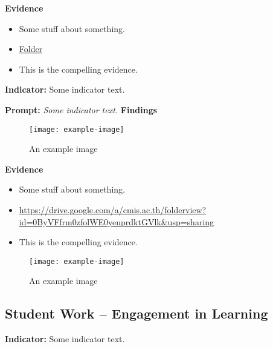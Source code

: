\documentclass{report}
\begin{document}
\noindent\textbf{Evidence}
\vspace{-\topsep}

\begin{itemize}[leftmargin=*]
\setlength{\parskip}{0pt}
\setlength{\itemsep}{0pt plus 1pt}
\item Some stuff about something.
\item \href{https://drive.google.com/a/cmis.ac.th/folderview?id=0ByVFfrm0zfolWE0yenprdktGVlk&usp=sharing}{Folder}
\item This is the compelling evidence.
\end{itemize}

\noindent\textbf{Indicator:} Some indicator text.

\noindent\textbf{Prompt:} \textit{Some indicator text.}
\noindent\textbf{Findings}

\blindtext

\blinditemize[6]

\blindtext

\begin{figure}[h!]
\caption[An example image]{An example image}
\centering
\texttt{[image: example-image]}
\end{figure}


\noindent\textbf{Evidence}
\vspace{-\topsep}

\begin{itemize}[leftmargin=*]
\setlength{\parskip}{0pt}
\setlength{\itemsep}{0pt plus 1pt}
\item Some stuff about something.
\item \url{https://drive.google.com/a/cmis.ac.th/folderview?id=0ByVFfrm0zfolWE0yenprdktGVlk&usp=sharing}
\item This is the compelling evidence.
\end{itemize}

\begin{figure}[h!]
\caption[An example image]{An example image}
\centering
\texttt{[image: example-image]}
\end{figure}


\subsection{Student Work -- Engagement in Learning}
\blindtext

\blindtext
 
\noindent\textbf{Indicator:} Some indicator text.
\end{document}

